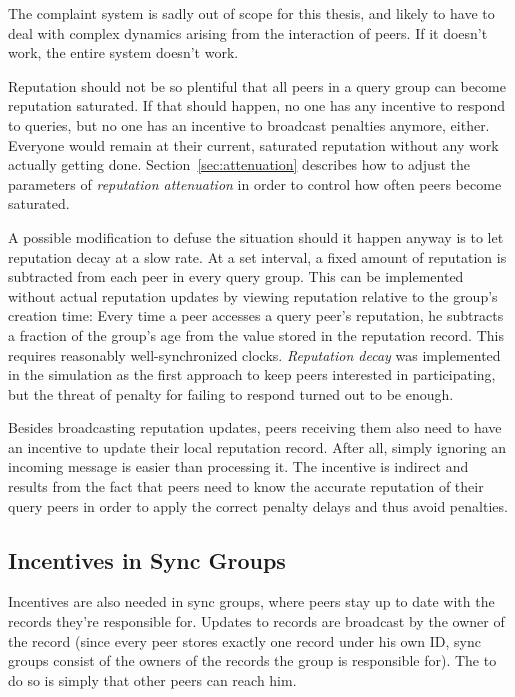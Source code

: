The complaint system is sadly out of scope for this thesis, and likely to have
to deal with complex dynamics arising from the interaction of peers. If it
doesn't work, the entire system doesn't work.

Reputation should not be so plentiful that all peers in a query group can become
reputation saturated. If that should happen, no one has any incentive to respond
to queries, but no one has an incentive to broadcast penalties anymore, either.
Everyone would remain at their current, saturated reputation without any work
actually getting done. Section~\ref{sec:attenuation} describes how to adjust the
parameters of \emph{reputation attenuation} in order to control how often peers
become saturated.

A possible modification to defuse the situation should it happen anyway is to
let reputation decay at a slow rate. At a set interval, a fixed amount of
reputation is subtracted from each peer in every query group. This can be
implemented without actual reputation updates by viewing reputation relative to
the group's creation time: Every time a peer accesses a query peer's reputation,
he subtracts a fraction of the group's age from the value stored in the
reputation record. This requires reasonably well-synchronized clocks.
\emph{Reputation decay} was implemented in the simulation as the first approach
to keep peers interested in participating, but the threat of penalty for failing
to respond turned out to be enough.

Besides broadcasting reputation updates, peers receiving them also need to have
an incentive to update their local reputation record. After all, simply ignoring
an incoming message is easier than processing it. The incentive is indirect and
results from the fact that peers need to know the accurate reputation of their
query peers in order to apply the correct penalty delays and thus avoid
penalties.

\subsection{Incentives in Sync Groups}
\label{sec:desc_incentives_sync}
Incentives are also needed in sync groups, where peers stay up to date with the
records they're responsible for. Updates to records are broadcast by the owner
of the record (since every peer stores exactly one record under his own ID, sync
groups consist of the owners of the records the group is responsible for). The
to do so is simply that other peers can reach him.

